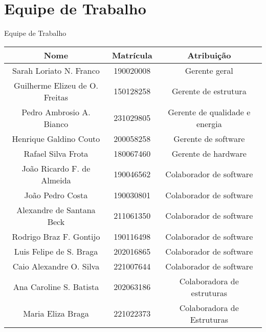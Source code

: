\chapter{Equipe de Trabalho}

\begin{quadro}[htb]
  \caption{\label{quadro_equipe_trabalho}Equipe de Trabalho}

  \begin{tabular}{|c|c|c|}
    \hline
    \textbf{Nome} & \textbf{Matrícula} & \textbf{Atribuição} \\
    \hline
    Sarah Loriato N. Franco & 190020008 & Gerente geral \\
    \hline
    Guilherme Elizeu de O. Freitas & 150128258 & Gerente de estrutura \\
    \hline
    Pedro Ambrosio A. Bianco & 231029805 & Gerente de qualidade e energia \\
    \hline
    Henrique Galdino Couto & 200058258 & Gerente de software \\
    \hline
    Rafael Silva Frota & 180067460 & Gerente de hardware \\
    \hline
    João Ricardo F. de Almeida & 190046562 & Colaborador de software \\
    \hline
    João Pedro Costa & 190030801 & Colaborador de software \\
    \hline
    Alexandre de Santana Beck & 211061350 & Colaborador de software \\
    \hline
    Rodrigo Braz F. Gontijo & 190116498 & Colaborador de software \\
    \hline
    Luis Felipe de S. Braga & 202016865 & Colaborador de software \\
    \hline
    Caio Alexandre O. Silva & 221007644 & Colaborador de software \\
    \hline
    Ana Caroline S. Batista & 202063186 & Colaboradora de estruturas \\
    \hline
    Maria Eliza Braga & 221022373 & Colaboradora de Estruturas \\
    \hline
  \end{tabular}

\end{quadro}
